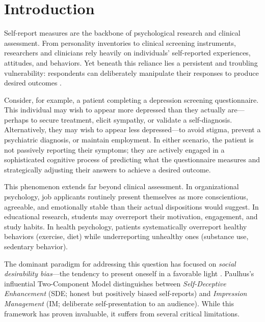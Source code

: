 \documentclass[10pt,twocolumn]{article}
\begin{document}

\section{Introduction}

Self-report measures are the backbone of psychological research and clinical assessment. From personality inventories to clinical screening instruments, researchers and clinicians rely heavily on individuals' self-reported experiences, attitudes, and behaviors. Yet beneath this reliance lies a persistent and troubling vulnerability: respondents can deliberately manipulate their responses to produce desired outcomes \citep{Paulhus1984}.

Consider, for example, a patient completing a depression screening questionnaire. This individual may wish to appear more depressed than they actually are---perhaps to secure treatment, elicit sympathy, or validate a self-diagnosis. Alternatively, they may wish to appear less depressed---to avoid stigma, prevent a psychiatric diagnosis, or maintain employment. In either scenario, the patient is not passively reporting their symptoms; they are actively engaged in a sophisticated cognitive process of predicting what the questionnaire measures and strategically adjusting their answers to achieve a desired outcome.

This phenomenon extends far beyond clinical assessment. In organizational psychology, job applicants routinely present themselves as more conscientious, agreeable, and emotionally stable than their actual dispositions would suggest. In educational research, students may overreport their motivation, engagement, and study habits. In health psychology, patients systematically overreport healthy behaviors (exercise, diet) while underreporting unhealthy ones (substance use, sedentary behavior).

The dominant paradigm for addressing this question has focused on \textit{social desirability bias}---the tendency to present oneself in a favorable light \citep{Edwards1953, CrowneMarlowe1960}. Paulhus's \citep{Paulhus1984} influential Two-Component Model distinguishes between \textit{Self-Deceptive Enhancement} (SDE; honest but positively biased self-reports) and \textit{Impression Management} (IM; deliberate self-presentation to an audience). While this framework has proven invaluable, it suffers from several critical limitations.
\end{document}
